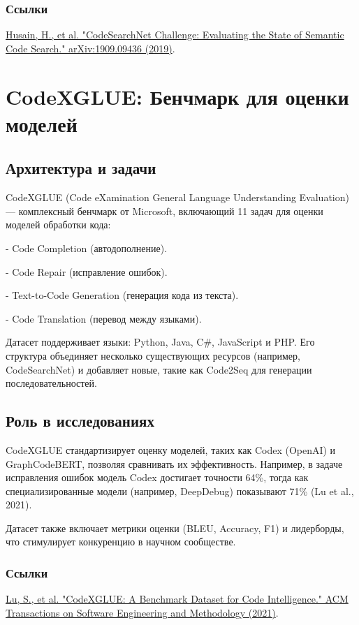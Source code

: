 \subsubsection*{Ссылки}
\href{https://arxiv.org/abs/1909.09436}{Husain, H., et al. "CodeSearchNet Challenge: Evaluating the State of Semantic Code Search." arXiv:1909.09436 (2019)}.

\newpage

\section{CodeXGLUE: Бенчмарк для оценки моделей}

\subsection{Архитектура и задачи}
CodeXGLUE (Code eXamination General Language Understanding Evaluation) — комплексный бенчмарк от Microsoft, включающий 11 задач для оценки моделей обработки кода:

    
- Code Completion (автодополнение).
    
- Code Repair (исправление ошибок).
    
- Text-to-Code Generation (генерация кода из текста).
    
- Code Translation (перевод между языками).


Датасет поддерживает языки: Python, Java, C\#, JavaScript и PHP. Его структура объединяет несколько существующих ресурсов (например, CodeSearchNet) и добавляет новые, такие как Code2Seq для генерации последовательностей.

\subsection{Роль в исследованиях}
CodeXGLUE стандартизирует оценку моделей, таких как Codex (OpenAI) и GraphCodeBERT, позволяя сравнивать их эффективность. Например, в задаче исправления ошибок модель Codex достигает точности 64\%, тогда как специализированные модели (например, DeepDebug) показывают 71\% (Lu et al., 2021).

Датасет также включает метрики оценки (BLEU, Accuracy, F1) и лидерборды, что стимулирует конкуренцию в научном сообществе.

\subsubsection*{Ссылки}
\href{https://dl.acm.org/doi/10.1145/3484577}{Lu, S., et al. "CodeXGLUE: A Benchmark Dataset for Code Intelligence." ACM Transactions on Software Engineering and Methodology (2021)}.

